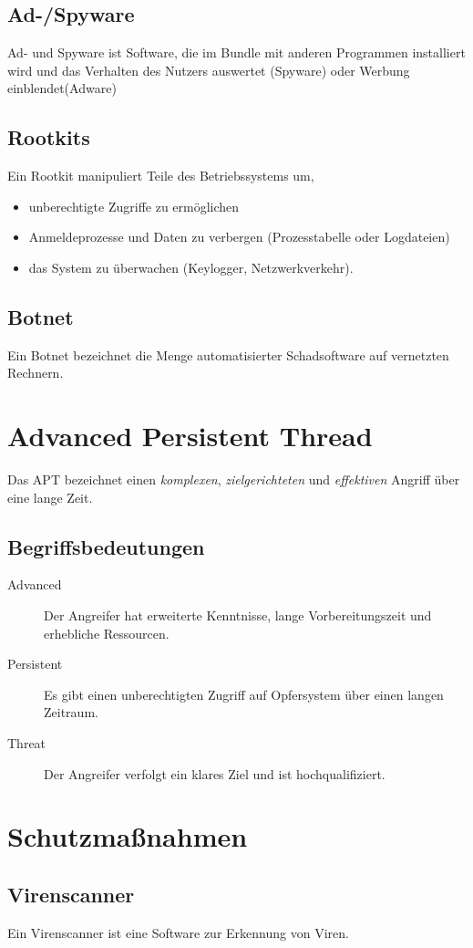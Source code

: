 \documentclass{report}
\begin{document}
\subsection{Ad-/Spyware}
Ad- und Spyware ist Software, die im Bundle mit anderen Programmen installiert wird und das Verhalten des Nutzers auswertet (Spyware) oder Werbung einblendet(Adware)
\subsection{Rootkits}
Ein Rootkit manipuliert Teile des Betriebssystems um,
\begin{itemize}
    \item unberechtigte Zugriffe zu ermöglichen
    \item Anmeldeprozesse und Daten zu verbergen (Prozesstabelle oder Logdateien)
    \item das System zu überwachen (Keylogger, Netzwerkverkehr).
\end{itemize}
\subsection{Botnet}
Ein Botnet bezeichnet die Menge automatisierter Schadsoftware auf vernetzten Rechnern.

\section{Advanced Persistent Thread}
Das APT bezeichnet einen \textit{komplexen}, \textit{zielgerichteten} und \textit{effektiven} Angriff über eine lange Zeit.
\subsection{Begriffsbedeutungen}
\begin{description}
    \item[Advanced] Der Angreifer hat erweiterte Kenntnisse, lange Vorbereitungszeit und erhebliche Ressourcen.
    \item[Persistent] Es gibt einen unberechtigten Zugriff auf Opfersystem über einen langen Zeitraum.
    \item[Threat] Der Angreifer verfolgt ein klares Ziel und ist hochqualifiziert.  
\end{description}
\section{Schutzmaßnahmen}
\subsection{Virenscanner}
Ein Virenscanner ist eine Software zur Erkennung von Viren.
\end{document}
